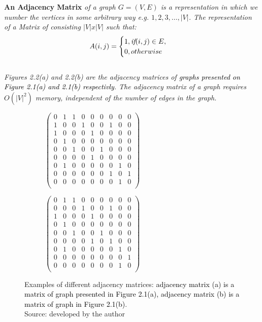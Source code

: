 \begin{definition} \textbf{An Adjacency Matrix } \emph{of a graph $G=(V, E)$ is a representation in which we number the vertices in some arbitrary way e.g. $1,2,3,\dots, |V|$. The representation of a Matrix of
consisting $|V|x|V|$ such that: 
$$A(i,j)=
\begin{cases}
1, \emph{if}  (i,j)\in E,\\
0, otherwise\\
\end{cases}$$
}
\\
\emph{Figures 2.2(a) and 2.2(b) are the adjacency matrices of \textcolor{black}{graphs presented on Figure 2.1(a) and 2.1(b) respectivly}.
The adjacency matrix of a graph requires $O(|V|^2)$ memory, independent of the number of edges in the graph.}
\end{definition}
\begin{figure}[!h]
	\centering
	\begin{subfigure}{.35\textwidth}
	  \centering
	  $\begin{pmatrix}
		0&1&1&0&0&0&0&0&0\\
		1&0&0&1&0&0&1&0&0\\
		1&0&0&0&1&0&0&0&0\\
		0&1&0&0&0&0&0&0&0\\
		0&0&1&0&0&1&0&0&0\\
		0&0&0&0&1&0&0&0&0\\
		0&1&0&0&0&0&0&1&0\\
		0&0&0&0&0&0&1&0&1\\
		0&0&0&0&0&0&0&1&0\\
	\end{pmatrix}$
	  \caption{}
	  \label{fig:sub1}
	\end{subfigure}
	\begin{subfigure}{.35\textwidth}
	  \centering
	  $\begin{pmatrix}
		0&1&1&0&0&0&0&0&0\\
		0&0&0&1&0&0&1&0&0\\
		1&0&0&0&1&0&0&0&0\\
		0&1&0&0&0&0&0&0&0\\
		0&0&1&0&0&1&0&0&0\\
		0&0&0&0&1&0&1&0&0\\
		0&1&0&0&0&0&0&1&0\\
		0&0&0&0&0&0&0&0&1\\
		0&0&0&0&0&0&0&1&0\\
	\end{pmatrix}$
	  \caption{}
	  \label{fig:sub2}
	\end{subfigure}
	\caption{Examples of different adjacency matrices: \textcolor{black}{adjacency matrix (a) is a matrix of graph presented in Figure 2.1(a), adjacency matrix (b) is a matrix of graph in Figure 2.1(b)}.\\ Source: developed by the author }
	\label{fig:test}
\end{figure}

